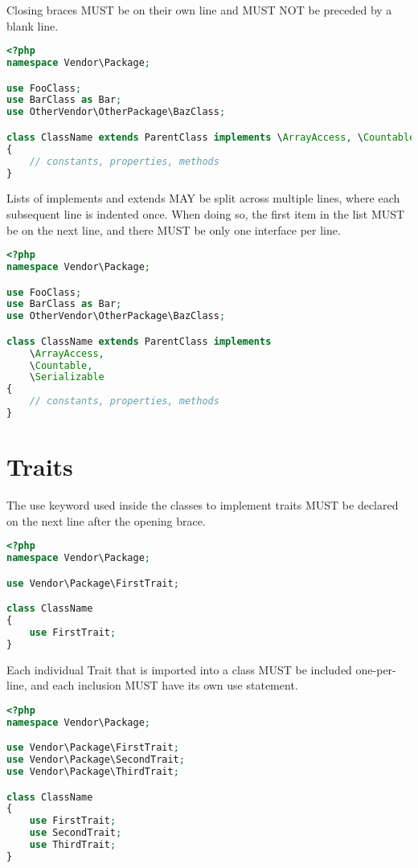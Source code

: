 Closing braces MUST be on their own line and MUST NOT be preceded by a blank line.




\begin{lstlisting}[language=PHP]
<?php
namespace Vendor\Package;

use FooClass;
use BarClass as Bar;
use OtherVendor\OtherPackage\BazClass;

class ClassName extends ParentClass implements \ArrayAccess, \Countable
{
    // constants, properties, methods
}
\end{lstlisting}

Lists of implements and extends MAY be split across multiple lines, where each subsequent line is indented once. When doing so, the first item in the list MUST be on the next line, and there MUST be only one interface per line.




\begin{lstlisting}[language=PHP]
<?php
namespace Vendor\Package;

use FooClass;
use BarClass as Bar;
use OtherVendor\OtherPackage\BazClass;

class ClassName extends ParentClass implements
    \ArrayAccess,
    \Countable,
    \Serializable
{
    // constants, properties, methods
}
\end{lstlisting}


\section{Traits}

The use keyword used inside the classes to implement traits MUST be declared on the next line after the opening brace.




\begin{lstlisting}[language=PHP]
<?php
namespace Vendor\Package;

use Vendor\Package\FirstTrait;

class ClassName
{
    use FirstTrait;
}
\end{lstlisting}


Each individual Trait that is imported into a class MUST be included one-per-line, and each inclusion MUST have its own use statement.





\begin{lstlisting}[language=PHP]
<?php
namespace Vendor\Package;

use Vendor\Package\FirstTrait;
use Vendor\Package\SecondTrait;
use Vendor\Package\ThirdTrait;

class ClassName
{
    use FirstTrait;
    use SecondTrait;
    use ThirdTrait;
}
\end{lstlisting}




